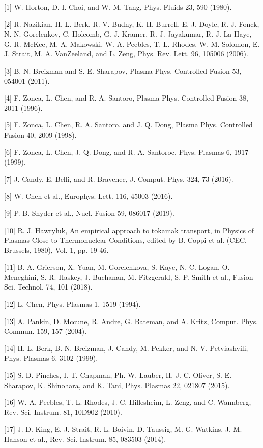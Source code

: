 \documentclass[10pt]{article}
\begin{document}
[1] W. Horton, D.-I. Choi, and W. M. Tang, Phys. Fluids 23, 590 (1980).

[2] R. Nazikian, H. L. Berk, R. V. Budny, K. H. Burrell, E. J. Doyle, R. J. Fonck, N. N. Gorelenkov, C. Holcomb, G. J. Kramer, R. J. Jayakumar, R. J. La Haye, G. R. McKee, M. A. Makowski, W. A. Peebles, T. L. Rhodes, W. M. Solomon, E. J. Strait, M. A. VanZeeland, and L. Zeng, Phys. Rev. Lett. 96, 105006 (2006).

[3] B. N. Breizman and S. E. Sharapov, Plasma Phys. Controlled Fusion 53, 054001 (2011).

[4] F. Zonca, L. Chen, and R. A. Santoro, Plasma Phys. Controlled Fusion 38, 2011 (1996).

[5] F. Zonca, L. Chen, R. A. Santoro, and J. Q. Dong, Plasma Phys. Controlled Fusion 40, 2009 (1998).

[6] F. Zonca, L. Chen, J. Q. Dong, and R. A. Santoroc, Phys. Plasmas 6, 1917 (1999).

[7] J. Candy, E. Belli, and R. Bravenec, J. Comput. Phys. 324, 73 (2016).

[8] W. Chen et al., Europhys. Lett. 116, 45003 (2016).

[9] P. B. Snyder et al., Nucl. Fusion 59, 086017 (2019).

[10] R. J. Hawryluk, An empirical approach to tokamak transport, in Physics of Plasmas Close to Thermonuclear Conditions, edited by B. Coppi et al. (CEC, Brussels, 1980), Vol. 1, pp. 19-46.

[11] B. A. Grierson, X. Yuan, M. Gorelenkova, S. Kaye, N. C. Logan, O. Meneghini, S. R. Haskey, J. Buchanan, M. Fitzgerald, S. P. Smith et al., Fusion Sci. Technol. 74, 101 (2018).

[12] L. Chen, Phys. Plasmas 1, 1519 (1994).

[13] A. Pankin, D. Mccune, R. Andre, G. Bateman, and A. Kritz, Comput. Phys. Commun. 159, 157 (2004).

[14] H. L. Berk, B. N. Breizman, J. Candy, M. Pekker, and N. V. Petviashvili, Phys. Plasmas 6, 3102 (1999).

[15] S. D. Pinches, I. T. Chapman, Ph. W. Lauber, H. J. C. Oliver, S. E. Sharapov, K. Shinohara, and K. Tani, Phys. Plasmas 22, 021807 (2015).

[16] W. A. Peebles, T. L. Rhodes, J. C. Hillesheim, L. Zeng, and C. Wannberg, Rev. Sci. Instrum. 81, 10D902 (2010).

[17] J. D. King, E. J. Strait, R. L. Boivin, D. Taussig, M. G. Watkins, J. M. Hanson et al., Rev. Sci. Instrum. 85, 083503 (2014).
\end{document}

